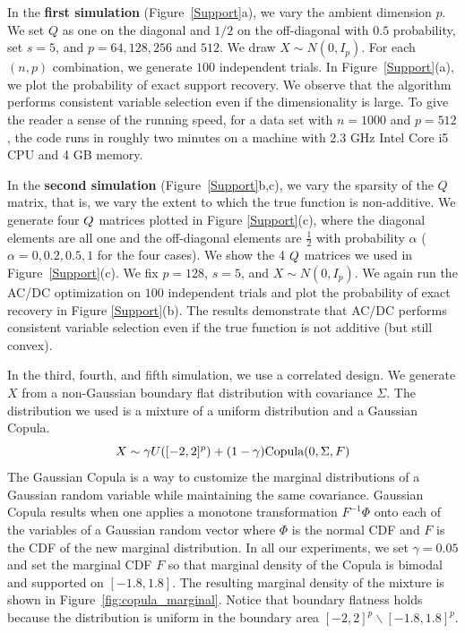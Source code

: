 In the \textbf{first simulation} (Figure~\ref{Support}a), we vary the ambient dimension $p$. We set $Q$ as one on the diagonal and $1/2$ on the off-diagonal with $0.5$ probability, set $s=5$, and $p=64,128,256$ and $512$. We draw $X \sim N(0, I_p)$.
For each $(n,p)$ combination, we generate $100$ independent trials. 
In Figure~\ref{Support}(a), we plot the probability of exact
support recovery. We observe that the algorithm performs consistent variable selection even if the dimensionality is large. To give the reader a
sense of the running speed, for a 
data set with $n=1000$ and $p=512$, the code runs in roughly two 
minutes on a machine with 2.3 GHz Intel Core i5 CPU and 4 GB memory. 


In the \textbf{second simulation} (Figure~\ref{Support}b,c), we vary the sparsity of the $Q$ matrix, that is, we vary the extent to which the true function is non-additive. We generate four $Q$ matrices
plotted in Figure \ref{Support}(c), where the diagonal elements are all one and
the off-diagonal elements are $\frac{1}{2}$ with probability $\alpha$
($\alpha=0,0.2,0.5,1$ for the four cases). We show the 4 $Q$ matrices we used in Figure~\ref{Support}(c).
We fix $p=128$, $s=5$, and $X \sim N(0,I_p)$.  We again run the AC/DC optimization on $100$
independent trials and plot the probability of exact recovery
in Figure \ref{Support}(b). The results demonstrate that AC/DC performs
consistent variable selection even if the true function is not additive (but
still convex). 

In the third, fourth, and fifth simulation, we use a correlated design. We generate $X$ from a non-Gaussian boundary flat distribution with covariance $\Sigma$. The distribution we used is a mixture of a uniform distribution and a Gaussian Copula.
\[
X \sim \gamma U([-2, 2]^p) + (1-\gamma) \textrm{Copula}(0, \Sigma, F)
\]
The Gaussian Copula is a way to customize the marginal distributions of a Gaussian random variable while maintaining the same covariance. Gaussian Copula results when one applies a monotone transformation $F^{-1} \Phi$ onto each of the variables of a Gaussian random vector where $\Phi$ is the normal CDF and $F$ is the CDF of the new marginal distribution. In all our experiments, we set $\gamma = 0.05$ and set the marginal CDF $F$ so that marginal density of the Copula is bimodal and supported on $[-1.8, 1.8]$. The resulting marginal density of the mixture is shown in Figure~\ref{fig:copula_marginal}. Notice that boundary flatness holds because the distribution is uniform in the boundary area $[-2,2]^p \backslash [-1.8, 1.8]^p$.


